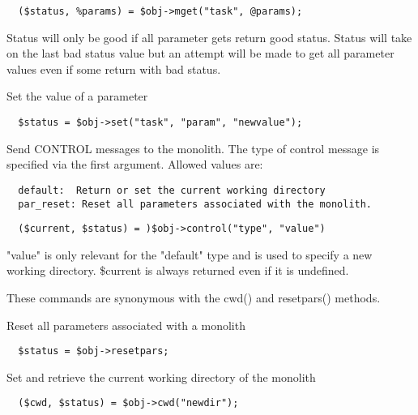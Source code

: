 \begin{description}
\begin{verbatim}
  ($status, %params) = $obj->mget("task", @params);
\end{verbatim}


Status will only be good if all parameter gets return good
status. Status will take on the last bad status value but
an attempt will be made to get all parameter values even if
some return with bad status.


\item[{\textbf{set}}] \mbox{}

Set the value of a parameter

\begin{verbatim}
  $status = $obj->set("task", "param", "newvalue");
\end{verbatim}

\item[{\textbf{control}}] \mbox{}

Send CONTROL messages to the monolith. The type of control
message is specified via the first argument. Allowed values are:

\begin{verbatim}
  default:  Return or set the current working directory
  par_reset: Reset all parameters associated with the monolith.
\end{verbatim}
\begin{verbatim}
  ($current, $status) = )$obj->control("type", "value")
\end{verbatim}


"value" is only relevant for the "default" type and is used
to specify a new working directory. \$current is always returned
even if it is undefined.



These commands are synonymous with the cwd() and resetpars()
methods.


\item[{\textbf{resetpars}}] \mbox{}

Reset all parameters associated with a monolith

\begin{verbatim}
  $status = $obj->resetpars;
\end{verbatim}

\item[{\textbf{cwd}}] \mbox{}

Set and retrieve the current working directory of the monolith

\begin{verbatim}
  ($cwd, $status) = $obj->cwd("newdir");
\end{verbatim}


\end{description}
